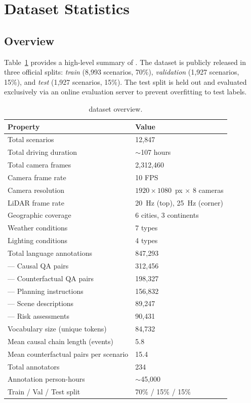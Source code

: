 \section{Dataset Statistics}
\label{sec:statistics}

\subsection{Overview}
\label{ssec:stats_overview}

Table~\ref{tab:dataset_overview} provides a high-level summary of \lucid{}. The
dataset is publicly released in three official splits: \textit{train} (8,993 scenarios,
70\%), \textit{validation} (1,927 scenarios, 15\%), and \textit{test} (1,927 scenarios,
15\%). The test split is held out and evaluated exclusively via an online evaluation
server to prevent overfitting to test labels.

\begin{table}[htbp]
  \centering
  \caption{\lucid{} dataset overview.}
  \label{tab:dataset_overview}
  \small
  \begin{tabular}{ll}
    \toprule
    \textbf{Property} & \textbf{Value} \\
    \midrule
    Total scenarios           & 12,847 \\
    Total driving duration    & $\sim$107 hours \\
    Total camera frames       & 2,312,460 \\
    Camera frame rate         & 10 FPS \\
    Camera resolution         & $1920 \times 1080$~px $\times$ 8 cameras \\
    LiDAR frame rate          & 20~Hz (top), 25~Hz (corner) \\
    Geographic coverage       & 6 cities, 3 continents \\
    Weather conditions        & 7 types \\
    Lighting conditions       & 4 types \\
    Total language annotations & 847,293 \\
    --- Causal QA pairs       & 312,456 \\
    --- Counterfactual QA pairs & 198,327 \\
    --- Planning instructions & 156,832 \\
    --- Scene descriptions    & 89,247 \\
    --- Risk assessments      & 90,431 \\
    Vocabulary size (unique tokens) & 84,732 \\
    Mean causal chain length (events) & 5.8 \\
    Mean counterfactual pairs per scenario & 15.4 \\
    Total annotators          & 234 \\
    Annotation person-hours   & $\sim$45,000 \\
    \midrule
    Train / Val / Test split  & 70\% / 15\% / 15\% \\
    \bottomrule
  \end{tabular}
\end{table}

